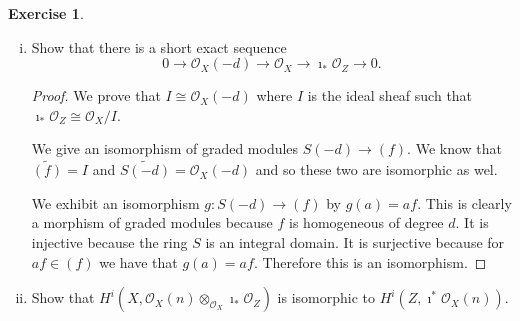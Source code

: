 \documentclass{article}
\newcommand{\sheaf}{\mathcal{O}}
\newcommand{\FF}{\mathcal{F}}
\newcommand{\incl}{\imath}
\theoremstyle{definition}
\newtheorem{question}{Exercise}
\begin{document}
\begin{question}
\begin{enumerate}[(i)]
\begin{proof}
                  We know that
                  \[
                      \FF_{x}\otimes_{\sheaf_{X}}\incl_{*}\sheaf_{Z}\cong\begin{cases}
                          \FF_{x}\otimes_{\sheaf_{X,x}}\sheaf_{Z,x} & x\in Z,    \\
                          \FF_{x}\otimes 0\cong0                    & x\notin Z.
                      \end{cases}
                  \]
                  The map on stalks
                  \(\FF_{x}\otimes_{\sheaf_{X}}\incl_{*}\sheaf_{Z}\to\incl_{*}\incl^{*}\FF\)
                  for \(x\in Z\) is then given by
                  \[
                      f\otimes g\mapsto fg\otimes 1=f\otimes g.
                  \]
                  Therefore it is clearly an isomorphism on all stalks.
              \end{proof}

        \item Show that there is a short exact sequence
              \[
                  0\to\sheaf_{X}(-d)\to\sheaf_{X}\to\incl_{*}\sheaf_{Z}\to0.
              \]

              \begin{proof}
                  We prove that \(I\cong\sheaf_{X}(-d)\) where \(I\) is the
                  ideal sheaf such that
                  \(\incl_{*}\sheaf_{Z}\cong\sheaf_{X}/I\).

                  We give an isomorphism of graded modules \(S(-d)\to (f)\). We
                  know that \(\widetilde{(f)}=I\) and
                  \(\widetilde{S(-d)}=\sheaf_{X}(-d)\) and so these two are
                  isomorphic as wel.

                  We exhibit an isomorphism \(g:S(-d)\to(f)\) by \(g(a)=af\).
                  This is clearly a morphism of graded modules because \(f\) is
                  homogeneous of degree \(d\). It is injective because the ring
                  \(S\) is an integral domain. It is surjective because for
                  \(af\in(f)\) we have that \(g(a)=af\). Therefore this is an
                  isomorphism.
              \end{proof}

        \item Show that
              \(H^{i}(X,\sheaf_{X}(n)\otimes_{\sheaf_{X}}\incl_{*}\sheaf_{Z})\)
              is isomorphic to \(H^{i}(Z,\incl^{*}\sheaf_{X}(n))\).


\end{enumerate}
\end{question}
\end{document}
